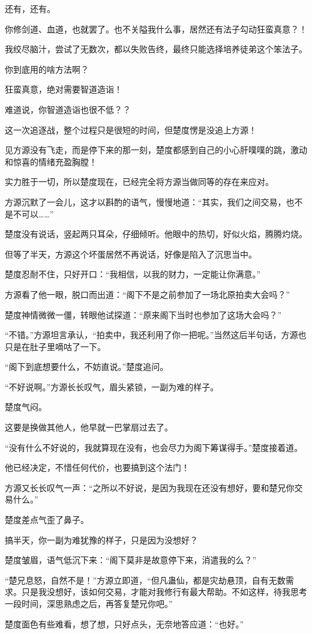 \begin{this_body}
还有，还有。

你修剑道、血道，也就罢了。也不关隘我什么事，居然还有法子勾动狂蛮真意？！

我绞尽脑汁，尝试了无数次，都以失败告终，最终只能选择培养徒弟这个笨法子。

你到底用的啥方法啊？

狂蛮真意，绝对需要智道造诣！

难道说，你智道造诣也很不低？？

这一次追逐战，整个过程只是很短的时间，但楚度愣是没追上方源！

见方源没有飞走，而是停下来的那一刻，楚度都感到自己的小心肝噗噗的跳，激动和惊喜的情绪充盈胸膛！

实力胜于一切，所以楚度现在，已经完全将方源当做同等的存在来应对。

方源沉默了一会儿，这才以斟酌的语气，慢慢地道：“其实，我们之间交易，也不是不可以……”

楚度没有说话，竖起两只耳朵，仔细倾听。他眼中的热切，好似火焰，腾腾灼烧。

但等了半天，方源这个坏蛋居然不再说话，好像是陷入了沉思当中。

楚度忍耐不住，只好开口：“我相信，以我的财力，一定能让你满意。”

方源看了他一眼，脱口而出道：“阁下不是之前参加了一场北原拍卖大会吗？”

楚度神情微微一僵，转眼他试探道：“原来阁下当时也参加了这场大会吗？”

“不错。”方源坦言承认，“拍卖中，我还利用了你一把呢。”当然这后半句话，方源也只是在肚子里嘀咕了一下。

“阁下到底想要什么，不妨直说。”楚度追问。

“不好说啊。”方源长长叹气，眉头紧锁，一副为难的样子。

楚度气闷。

这要是换做其他人，他早就一巴掌扇过去了。

“没有什么不好说的，我就算现在没有，也会尽力为阁下筹谋得手。”楚度接着道。

他已经决定，不惜任何代价，也要搞到这个法门！

方源又长长叹气一声：“之所以不好说，是因为我现在还没有想好，要和楚兄你交易什么。”

楚度差点气歪了鼻子。

搞半天，你一副为难犹豫的样子，只是因为没想好？

楚度皱眉，语气低沉下来：“阁下莫非是故意停下来，消遣我的么？”

“楚兄息怒，自然不是！”方源立即道，“但凡蛊仙，都是灾劫悬顶，自有无数需求。只是我没想好，该如何交易，才能对我修行有最大帮助。不如这样，待我思考一段时间，深思熟虑之后，再答复楚兄你吧。”

楚度面色有些难看，想了想，只好点头，无奈地答应道：“也好。”

\end{this_body}

